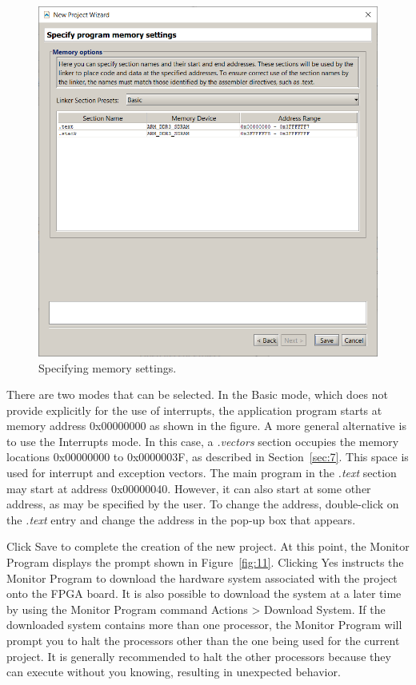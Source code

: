\documentclass[11pt, twoside, pdftex]{article}
\begin{document}
\begin{enumerate}
\begin{figure}[H]
   \begin{center}
      \includegraphics[scale=0.6]{screenshots/figure10.png}
   \end{center}
   \caption{Specifying memory settings.} 
	 \label{fig:10}
\end{figure}

There are two modes that can be selected. In the {\sf Basic}
mode, which does not provide explicitly for the use of
interrupts, the application program starts at memory address
0x00000000 as shown in the figure. A more general alternative
is to use the {\sf Interrupts} mode. In this case, a 
{\it .vectors} section occupies the memory locations 
0x00000000 to 0x0000003F, as described in Section~\ref{sec:7}.
This space is used for interrupt
and exception vectors. The main program in the {\it .text}
section may start at address 0x00000040. However, it can also
start at some other address, as may be specified by the user.
To change the address, double-click on the {\it .text} entry
and change the address in the pop-up box that appears. 
 
Click {\sf Save} to complete the creation of the new project.  At this point, the Monitor Program displays the prompt shown in
Figure~\ref{fig:11}. Clicking {\sf Yes} instructs the Monitor Program to
download the hardware system associated with the project onto 
the FPGA board. It is also possible to download the system 
at a later time by using the Monitor Program command
{\sf Actions > Download System}. 
If the downloaded system contains more than one processor,
the Monitor Program will prompt you to halt the processors other
than the one being used for the current project. 
It is generally recommended to halt the other processors because
they can execute without you knowing, resulting in unexpected behavior.


\end{enumerate}
\end{document}
